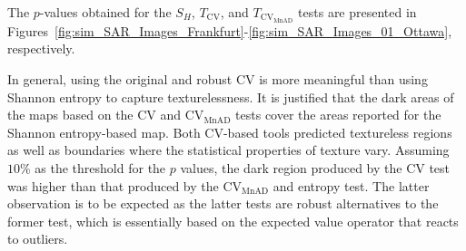 \documentclass[remotesensing,article,submit,moreauthors,pdftex]{Definitions/mdpi}
\begin{document}
The \(p\)-values obtained for the \(S_H\), \(T_{\text{CV}}\), and
\(T_{\text{CV}_{\text{MnAD}}}\) tests are presented in
Figures~\ref{fig:sim_SAR_Images_Frankfurt}-\ref{fig:sim_SAR_Images_01_Ottawa},
respectively.

In general, using the original and robust CV is more meaningful than using Shannon entropy to capture texturelessness.
It is justified that the dark areas of the maps based on the $\text{CV}$ and $\text{CV}_{\text{MnAD}}$ tests cover the areas reported for the Shannon entropy-based map.
Both CV-based tools predicted textureless regions as well as boundaries where the statistical properties of texture vary.
Assuming $10\%$ as the threshold for the $p$ values, the dark region produced by the $\text{CV}$ test was higher than that produced by the $\text{CV}_{\text{MnAD}}$ and entropy test.
The latter observation is to be expected as the latter tests are robust alternatives to the former test, which is essentially based on the expected value operator that reacts to outliers.
\end{document}
